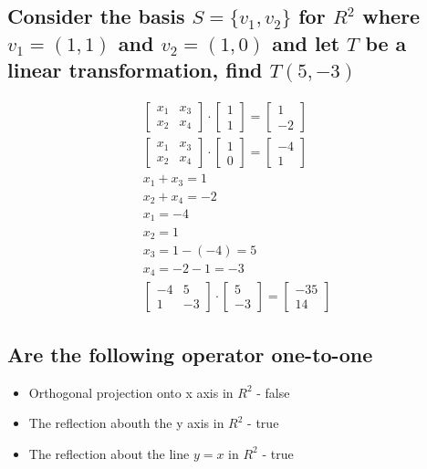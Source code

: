 \documentclass[12pt, a4paper]{article}
\begin{document}
		\subsection{Consider the basis $S=\{v_1,v_2\}$ for $R^2$ where $v_1=(1,1)$ and $v_2=(1,0)$ and let $T$ be a linear transformation, find $T(5,-3)$}
			\begin{align*}
				\begin{bmatrix}x_1&x_3\\x_2&x_4\end{bmatrix}\cdot \begin{bmatrix}1\\1\end{bmatrix}=\begin{bmatrix}1\\-2\end{bmatrix}\\
				\begin{bmatrix}x_1&x_3\\x_2&x_4\end{bmatrix}\cdot \begin{bmatrix}1\\0\end{bmatrix}=\begin{bmatrix}-4\\1\end{bmatrix}\\
				x_1+x_3=1\\
				x_2+x_4=-2\\
				x_1=-4\\
				x_2=1\\
				x_3=1-(-4)=5\\
				x_4=-2-1=-3\\
				\begin{bmatrix}-4&5\\1&-3\end{bmatrix}\cdot \begin{bmatrix}5\\-3\end{bmatrix}=\begin{bmatrix}-35\\14\end{bmatrix}
			\end{align*}
		\subsection{Are the following operator one-to-one}
			\begin{itemize}
				\item Orthogonal projection onto x axis in $R^2$ - false
				\item The reflection abouth the y axis in $R^2$ - true
				\item The reflection about the line $y=x$ in $R^2$ - true
			\end{itemize}
\end{document}
